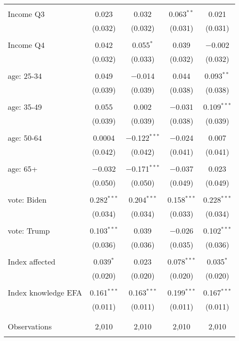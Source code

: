 \begin{tabular}{@{\extracolsep{5pt}}lcccc}
  & & & & \\ 
 Income Q3 & 0.023 & 0.032 & 0.063$^{**}$ & 0.021 \\ 
  & (0.032) & (0.032) & (0.031) & (0.031) \\ 
  & & & & \\ 
 Income Q4 & 0.042 & 0.055$^{*}$ & 0.039 & $-$0.002 \\ 
  & (0.032) & (0.033) & (0.032) & (0.032) \\ 
  & & & & \\ 
 age: 25-34 & 0.049 & $-$0.014 & 0.044 & 0.093$^{**}$ \\ 
  & (0.039) & (0.039) & (0.038) & (0.038) \\ 
  & & & & \\ 
 age: 35-49 & 0.055 & 0.002 & $-$0.031 & 0.109$^{***}$ \\ 
  & (0.039) & (0.039) & (0.038) & (0.039) \\ 
  & & & & \\ 
 age: 50-64 & 0.0004 & $-$0.122$^{***}$ & $-$0.024 & 0.007 \\ 
  & (0.042) & (0.042) & (0.041) & (0.041) \\ 
  & & & & \\ 
 age: 65+ & $-$0.032 & $-$0.171$^{***}$ & $-$0.037 & 0.023 \\ 
  & (0.050) & (0.050) & (0.049) & (0.049) \\ 
  & & & & \\ 
 vote: Biden & 0.282$^{***}$ & 0.204$^{***}$ & 0.158$^{***}$ & 0.228$^{***}$ \\ 
  & (0.034) & (0.034) & (0.033) & (0.034) \\ 
  & & & & \\ 
 vote: Trump & 0.103$^{***}$ & 0.039 & $-$0.026 & 0.102$^{***}$ \\ 
  & (0.036) & (0.036) & (0.035) & (0.036) \\ 
  & & & & \\ 
 Index affected & 0.039$^{*}$ & 0.023 & 0.078$^{***}$ & 0.035$^{*}$ \\ 
  & (0.020) & (0.020) & (0.020) & (0.020) \\ 
  & & & & \\ 
 Index knowledge EFA & 0.161$^{***}$ & 0.163$^{***}$ & 0.199$^{***}$ & 0.167$^{***}$ \\ 
  & (0.011) & (0.011) & (0.011) & (0.011) \\ 
  & & & & \\ 
\hline \\[-1.8ex] 

Observations & 2,010 & 2,010 & 2,010 & 2,010 \\ 
\hline 
\hline \\[-1.8ex] 
\end{tabular} 